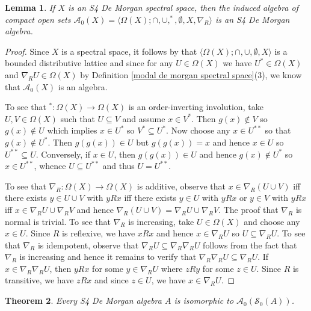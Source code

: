 \documentclass{amsart}
\theoremstyle{plain}
\newtheorem{theorem}{Theorem}[section]
\newtheorem{lemma}[theorem]{Lemma}
\theoremstyle{definition}
\begin{document}
\begin{lemma}\label{space to algebra}
    If $X$ is an S4 De Morgan spectral space, then the induced algebra of compact open sets $\mathcal{A}_0(X)=\langle\Omega(X);\cap,\cup,^*,\emptyset,X,\nabla_R\rangle$ is an S4 De Morgan algebra.  
\end{lemma}
\begin{proof}
    Since $X$ is a spectral space, it follows by \cite{stone2} that $\langle\Omega(X);\cap,\cup,\emptyset,X\rangle$ is a bounded distributive lattice and since for any $U\in\Omega(X)$ we have $U^*\in\Omega(X)$ and $\nabla_{R}U\in\Omega(X)$ by Definition \ref{modal de morgan spectral space}(3), we know that $\mathcal{A}_0(X)$ is an algebra. 
    
    
    To see that $^*\colon\Omega(X)\to\Omega(X)$ is an order-inverting involution, take $U,V\in\Omega(X)$ such that $U\subseteq V$ and assume $x\in V^*$. Then $g(x)\not\in V$ so $g(x)\not\in U$ which implies $x\in U^*$ so $V^*\subseteq U^*$. Now choose any $x\in U^{**}$ so that $g(x)\not\in U^*$. Then $g(g(x))\in U$  but $g(g(x))=x$ and hence $x\in U$ so $U^{**}\subseteq U$. Conversely, if $x\in U$, then $g(g(x))\in U$ and hence $g(x)\not\in U^*$ so $x\in U^{**}$, whence $U\subseteq U^{**}$ and thus $U=U^{**}$. 


    
To see that $\nabla_R\colon\Omega(X)\to\Omega(X)$ is additive, observe that $x\in \nabla_R(U\cup V)$ iff there exists $y\in U\cup V$ with $yRx$ iff there exists $y\in U$ with $yRx$ or $y\in V$ with $yRx$ iff $x\in \nabla_RU\cup \nabla_RV$ and hence $\nabla_R(U\cup V)=\nabla_RU\cup\nabla_RV$. The proof that $\nabla_R$ is normal is trivial. To see that $\nabla_R$ is increasing, take $U\in\Omega(X)$ and choose any $x\in U$. Since $R$ is reflexive, we have $xRx$ and hence $x\in \nabla_RU$ so $U\subseteq\nabla_RU$. To see that $\nabla_R$ is idempotent, observe that $\nabla_RU\subseteq\nabla_R\nabla_RU$ follows from the fact that $\nabla_R$ is increasing and hence it remains to verify that $\nabla_R\nabla_RU\subseteq\nabla_RU$. If $x\in\nabla_R\nabla_RU$, then $yRx$ for some $y\in \nabla_RU$ where $zRy$ for some $z\in U$. Since $R$ is transitive, we have $zRx$ and since $z\in U$, we have $x\in\nabla_RU$.     
\end{proof}
\begin{theorem}\label{rep theorem}
    Every S4 De Morgan algebra $A$ is isomorphic to $\mathcal{A}_0(\mathcal{S}_0(A))$. 
\end{theorem}
\end{document}
